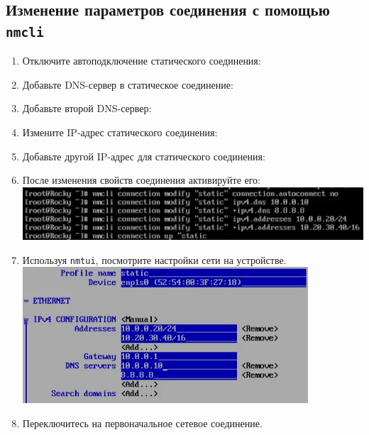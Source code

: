 \documentclass[12pt]{article}
\begin{document}
\subsection{Изменение параметров соединения с помощью \texttt{nmcli}}
\begin{enumerate}
	\item Отключите автоподключение статического соединения:
	\item Добавьте DNS-сервер в статическое соединение:
	\item Добавьте второй DNS-сервер:
	\item Измените IP-адрес статического соединения:
	\item Добавьте другой IP-адрес для статического соединения:
	\item После изменения свойств соединения активируйте его:
	      \\\includegraphics{13.png}
	\item Используя \texttt{nmtui}, посмотрите настройки сети на устройстве.
	      \\\includegraphics{14.png}
	\item Переключитесь на первоначальное сетевое соединение.
\end{enumerate}
\end{document}
